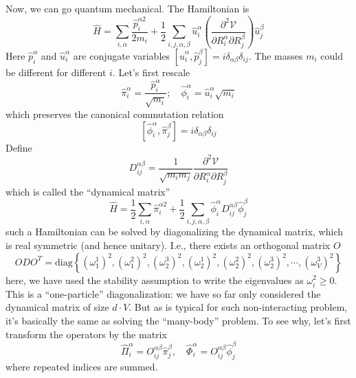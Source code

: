 Now, we can go quantum mechanical. The Hamiltonian is
\[ \hat{H}=\sum_{i,\alpha}{\frac{\hat{p}_{i}^{\alpha 2}}{2m_i}}+\frac{1}{2}\sum_{i,j,\alpha ,\beta}{\hat{u}_{i}^{\alpha}\left( \frac{\partial ^2\mathcal{V}}{\partial R_{i}^{\alpha}\partial R_{j}^{\beta}} \right) \hat{u}_{j}^{\beta}}\]
Here $\hat{p}_i^\alpha$ and $\hat{u}_i^\alpha$ are conjugate variables $\left[ \hat{u}_{i}^{\alpha},\hat{p}_{j}^{\beta} \right] =i\delta _{\alpha \beta}\delta _{ij}$. The masses $m_i$ could be different for different $i$. Let's first rescale
\[ \hat{\pi}_{i}^{\alpha}=\frac{\hat{p}_{i}^{\alpha}}{\sqrt{m_i}};\quad \hat{\phi}_{i}^{\alpha}=\hat{u}_{i}^{\alpha}\sqrt{m_i} \]
which preserves the canonical commutation relation
\[ \left[ \hat{\phi}_{i}^{\alpha},\hat{\pi}_{j}^{\beta} \right] =i\delta _{\alpha \beta}\delta _{ij}\]
Define
\[ D_{ij}^{\alpha \beta}=\frac{1}{\sqrt{m_im_j}}\frac{\partial ^2\mathcal{V}}{\partial R_{i}^{\alpha}\partial R_{j}^{\beta}}\]
which is called the ``dynamical matrix''
\[ \hat{H}=\frac{1}{2}\sum_{i,\alpha}{\hat{\pi}_{i}^{\alpha 2}}+\frac{1}{2}\sum_{i,j,\alpha ,\beta}{\hat{\phi}_{i}^{\alpha}D_{ij}^{\alpha \beta}\hat{\phi}_{j}^{\beta}}\]
such a Hamiltonian can be solved by diagonalizing the dynamical matrix, which is real symmetric (and hence unitary). I.e., there exists an orthogonal matrix $O$
\[ ODO^T=\mathrm{diag}\left\{ \left( \omega _{1}^{1} \right) ^2,\left( \omega _{1}^{2} \right) ^2,\left( \omega _{2}^{3} \right) ^2,\left( \omega _{2}^{1} \right) ^2,\left( \omega _{2}^{2} \right) ^2,\left( \omega _{2}^{3} \right) ^2,\cdots ,\left( \omega _{V}^{3} \right) ^2 \right\} \]
here, we have used the stability assumption to write the eigenvalues as $\omega_i^2\geq 0$. This is a ``one-particle'' diagonalization: we have so far only considered the dynamical matrix of size $d\cdot V$. But as is typical for such non-interacting problem, it's basically the same as solving the ``many-body'' problem. To see why, let's first transform the operators by the matrix
\[ \hat{\Pi}_{i}^{\alpha}=O_{ij}^{\alpha \beta}\hat{\pi}_{j}^{\beta},\quad \hat{\Phi}_{i}^{\alpha}=O_{ij}^{\alpha \beta}\hat{\phi}_{j}^{\beta}\]
where repeated indices are summed.

